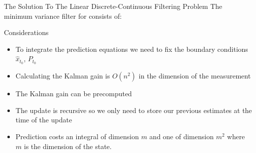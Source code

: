 \documentclass{beamer}
\begin{document}
\begin{frame}{The Solution To The Linear Discrete-Continuous Filtering Problem}
  The minimum variance filter for consists of: \\
\end{frame}

\begin{frame}{Considerations}
  \begin{itemize}
   \pause
\item To integrate the prediction equations we need to fix the boundary
  conditions $\hat{x}_{t_0}$, $P_{t_0}$
   \pause
  \item Calculating the Kalman gain is $O(n^2)$ in the dimension of the
    measurement
    \pause
  \item The Kalman gain can be precomputed
    \pause 
\item The update is recursive so we only need to store our previous estimates at
  the time of the update
  \pause
 
\item Prediction costs an integral of dimension $m$ and one of dimension $m^2$
  where $m$ is the dimension of the state.
  \end{itemize}

\end{frame}
\end{document}
